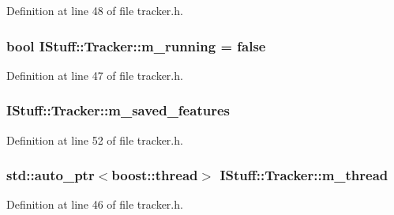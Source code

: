 Definition at line 48 of file tracker.\-h.

\hypertarget{class_i_stuff_1_1_tracker_a6859d6a02fe907e0dcc1b48b79ba0d9d}{
\subsubsection[{m\-\_\-running}]{\setlength{\rightskip}{0pt plus 5cm}bool I\-Stuff\-::\-Tracker\-::m\-\_\-running = false\hspace{0.3cm}{\ttfamily [private]}}}\label{class_i_stuff_1_1_tracker_a6859d6a02fe907e0dcc1b48b79ba0d9d}


Definition at line 47 of file tracker.\-h.

\hypertarget{class_i_stuff_1_1_tracker_a72081a14f4eb1193fa9800a1e37e0100}{
\subsubsection[{m\-\_\-saved\-\_\-features}]{ I\-Stuff\-::\-Tracker\-::m\-\_\-saved\-\_\-features\hspace{0.3cm}{\ttfamily [private]}}}\label{class_i_stuff_1_1_tracker_a72081a14f4eb1193fa9800a1e37e0100}


Definition at line 52 of file tracker.\-h.

\hypertarget{class_i_stuff_1_1_tracker_a76bb227e8681e75c9d7edd561e231ab6}{
\subsubsection[{m\-\_\-thread}]{\setlength{\rightskip}{0pt plus 5cm}std\-::auto\-\_\-ptr$<$boost\-::thread$>$ I\-Stuff\-::\-Tracker\-::m\-\_\-thread\hspace{0.3cm}{\ttfamily [private]}}}\label{class_i_stuff_1_1_tracker_a76bb227e8681e75c9d7edd561e231ab6}


Definition at line 46 of file tracker.\-h.

